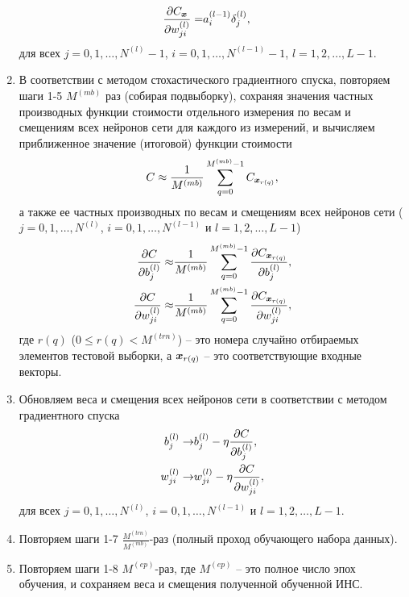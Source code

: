 \documentclass[a4paper,12pt,russian]{article} %
\begin{document}
\begin{enumerate}
\begin{equation}
\begin{split}
				\\
				\frac{\partial C_{\bm{x}}}{\partial w_{ji}^{(l)}} = & a_i^{(l-1)} \delta_j^{(l)},
			\end{split}
		\end{equation}
		для всех $j = 0, 1, \ldots, N^{(l)}-1$, $i = 0, 1, \ldots, N^{(l-1)}-1$, $l = 1, 2, \ldots, L-1$.
	\item
		В соответствии с методом стохастического градиентного спуска, повторяем шаги 1-5 $M^{(mb)}$ раз (собирая подвыборку), сохраняя значения частных производных функции стоимости отдельного измерения по весам и смещениям всех нейронов сети для каждого из измерений, и вычисляем приближенное значение (итоговой) функции стоимости
		$$
			C \approx \frac{1}{M^{(mb)}} \sum_{q=0}^{M^{(mb)}-1} C_{\bm{x}_{r(q)}},
		$$
		а также ее частных производных по весам и смещениям всех нейронов сети ($j = 0, 1, \ldots, N^{(l)}$, $i = 0, 1, \ldots, N^{(l-1)}$ и $l = 1, 2, \ldots, L-1$)
		\begin{equation} \notag
			\begin{split}
				\frac{\partial C}{\partial b_j^{(l)}} \approx &
					\frac{1}{M^{(mb)}} \sum_{q=0}^{M^{(mb)}-1} \frac{\partial C_{\bm{x}_{r(q)}}}{\partial b_j^{(l)}},
				\\
				\frac{\partial C}{\partial w_{ji}^{(l)}} \approx & 
					\frac{1}{M^{(mb)}} \sum_{q=0}^{M^{(mb)}-1} \frac{\partial C_{\bm{x}_{r(q)}}}{\partial w_{ji}^{(l)}},
			\end{split}
		\end{equation}
		где $r(q)$ ($0 \leq r(q) < M^{(trn)}$) -- это номера случайно отбираемых элементов тестовой выборки, а $\bm{x}_{r(q)}$ -- это соответствующие входные векторы.
	\item
		Обновляем веса и смещения всех нейронов сети в соответствии с методом градиентного спуска
		\begin{equation} \notag
			\begin{split}
				b_j^{(l)} \rightarrow & b_j^{(l)} - \eta \frac{\partial C}{\partial b_j^{(l)}},
				\\
				w_{ji}^{(l)} \rightarrow & w_{ji}^{(l)} - \eta \frac{\partial C}{\partial w_{ji}^{(l)}},
			\end{split}
		\end{equation}
		для всех $j = 0, 1, \ldots, N^{(l)}$, $i = 0, 1, \ldots, N^{(l-1)}$ и $l = 1, 2, \ldots, L-1$.
	\item
		Повторяем шаги 1-7 $\frac{M^{(trn)}}{M^{(mb)}}$-раз (полный проход обучающего набора данных).
	\item
		Повторяем шаги 1-8 $M^{(ep)}$-раз, где $M^{(ep)}$ -- это полное число эпох обучения, и сохраняем веса и смещения полученной обученной ИНС.
\end{enumerate}
\end{document}
